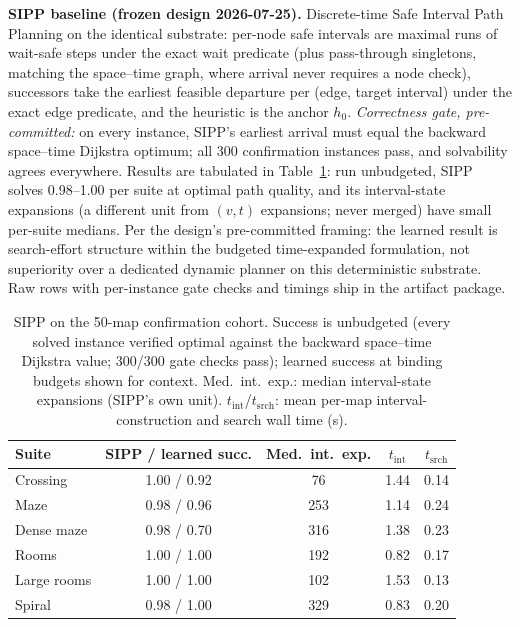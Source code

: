 \documentclass[letterpaper]{article} %
\begin{document}
\textbf{SIPP baseline (frozen design 2026-07-25).} Discrete-time Safe Interval Path Planning on the identical substrate: per-node safe intervals are maximal runs of wait-safe steps under the exact wait predicate (plus pass-through singletons, matching the space--time graph, where arrival never requires a node check), successors take the earliest feasible departure per (edge, target interval) under the exact edge predicate, and the heuristic is the anchor $h_0$. \emph{Correctness gate, pre-committed:} on every instance, SIPP's earliest arrival must equal the backward space--time Dijkstra optimum; all 300 confirmation instances pass, and solvability agrees everywhere. Results are tabulated in Table~\ref{tab:sipp}: run unbudgeted, SIPP solves 0.98--1.00 per suite at optimal path quality, and its interval-state expansions (a different unit from $(v,t)$ expansions; never merged) have small per-suite medians. Per the design's pre-committed framing: the learned result is search-effort structure within the budgeted time-expanded formulation, not superiority over a dedicated dynamic planner on this deterministic substrate. Raw rows with per-instance gate checks and timings ship in the artifact package.

\begin{table}[t]
\centering
\small
\setlength{\tabcolsep}{2.6pt}
\begin{tabular}{@{}lcccc@{}}
\toprule
Suite & SIPP / learned succ. & Med.\ int.\ exp. & $t_{\mathrm{int}}$ & $t_{\mathrm{srch}}$ \\
\midrule
Crossing & 1.00 / 0.92 & 76 & 1.44 & 0.14 \\
Maze & 0.98 / 0.96 & 253 & 1.14 & 0.24 \\
Dense maze & 0.98 / 0.70 & 316 & 1.38 & 0.23 \\
Rooms & 1.00 / 1.00 & 192 & 0.82 & 0.17 \\
Large rooms & 1.00 / 1.00 & 102 & 1.53 & 0.13 \\
Spiral & 0.98 / 1.00 & 329 & 0.83 & 0.20 \\
\bottomrule
\end{tabular}
\caption{SIPP on the 50-map confirmation cohort. Success is unbudgeted (every solved instance verified optimal against the backward space--time Dijkstra value; 300/300 gate checks pass); learned success at binding budgets shown for context. Med.\ int.\ exp.: median interval-state expansions (SIPP's own unit). $t_{\mathrm{int}}$/$t_{\mathrm{srch}}$: mean per-map interval-construction and search wall time (s).}
\label{tab:sipp}
\end{table}
\end{document}

